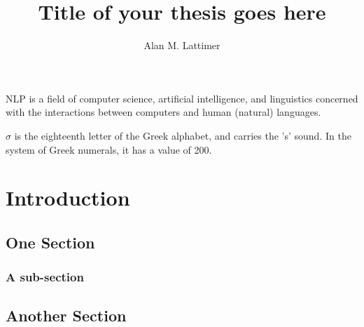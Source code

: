\documentclass[doublespace,draft,nopageskip]{VTthesis} %
\title{Title of your thesis goes here}
\author{Alan M. Lattimer}
\begin{document}
  \frontmatter
  \maketitle
  \tableofcontents

	\listoffigures
	\listoftables
    \printnomenclature %

NLP is a field of computer science, artificial intelligence, and linguistics concerned with the interactions between computers and human (natural) languages.
 
 
$\sigma$ is the eighteenth letter of the Greek alphabet, and carries the 's' sound. In the system of Greek numerals, it has a value of 200. 
 

	\mainmatter

	\chapter{Introduction} \label{ch:introduction}
   			\lipsum[1]
      
    \section{One Section} \label{se:one_section}
			\lipsum[2]
			\subsection{A sub-section} \label{ss:this_subsection}
				\lipsum[1-4]
		\section{Another Section} \label{se:another_section}
			\lipsum[1-2]
\end{document}
